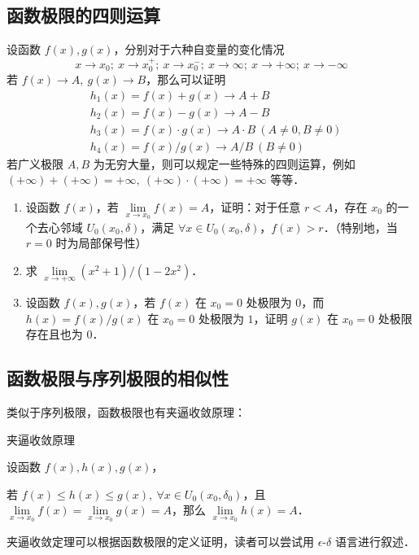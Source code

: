 \subsection{函数极限的四则运算}
设函数 $f(x),g(x)$，分别对于六种自变量的变化情况
\begin{equation}
  x\rightarrow x_0;\ x\rightarrow x_0^+;\ x\rightarrow x_0^{-};\ x\rightarrow \infty;\ x\rightarrow +\infty;\ x\rightarrow -\infty
\end{equation}
  若 $f(x)\rightarrow A,\ g(x)\rightarrow B$，那么可以证明
\begin{equation}
  \begin{aligned}
  &h_1(x)=f(x)+g(x)\rightarrow A+B\\
  &h_2(x)=f(x)-g(x)\rightarrow A-B\\
  &h_3(x)=f(x)\cdot g(x)\rightarrow A\cdot B\ (A\neq 0,B\neq 0)\\
  &h_4(x)=f(x)/ g(x)\rightarrow A/B\ (B\neq 0)
  \end{aligned}
\end{equation}
  若广义极限 $A,B$ 为无穷大量，则可以规定一些特殊的四则运算，例如 $(+\infty)+(+\infty)=+\infty,\ 
  (+\infty)\cdot (+\infty)=+\infty$ 等等．
\begin{exercise}{}
\begin{enumerate}
\item  设函数 $f(x)$，若 $\lim\limits_{x\rightarrow x_0}f(x)=A$，证明：对于任意 $r<A$，存在 $x_0$ 的一个去心邻域 $U_0(x_0,\delta)$，满足 $\forall x\in U_0(x_0,\delta)$，$f(x)>r$．（特别地，当 $r=0$ 时为局部保号性）
\item 求 $\lim\limits_{x\rightarrow +\infty}(x^2+1)/(1-2x^2)$．
\item 设函数 $f(x),g(x)$，若 $f(x)$ 在 $x_0=0$ 处极限为 $0$，而 $h(x)=f(x)/g(x)$ 在 $x_0=0$ 处极限为 $1$，证明 $g(x)$ 在 $x_0=0$ 处极限存在且也为 $0$．
\end{enumerate}

\end{exercise}

\subsection{函数极限与序列极限的相似性}

类似于序列极限，函数极限也有夹逼收敛原理：
\begin{theorem}{夹逼收敛原理}

  设函数 $f(x),h(x),g(x)$，

  若 $f(x)\le h(x)\le g(x),\ \forall x\in U_0(x_0,\delta_0)$，且 $\lim\limits_{x\rightarrow x_0}f(x)=\lim\limits_{x\rightarrow x_0} g(x)=A$，那么 $\lim\limits_{x\rightarrow x_0}h(x)=A$．
\end{theorem}
夹逼收敛定理可以根据函数极限的定义证明，读者可以尝试用 $\epsilon$-$\delta$ 语言进行叙述．


